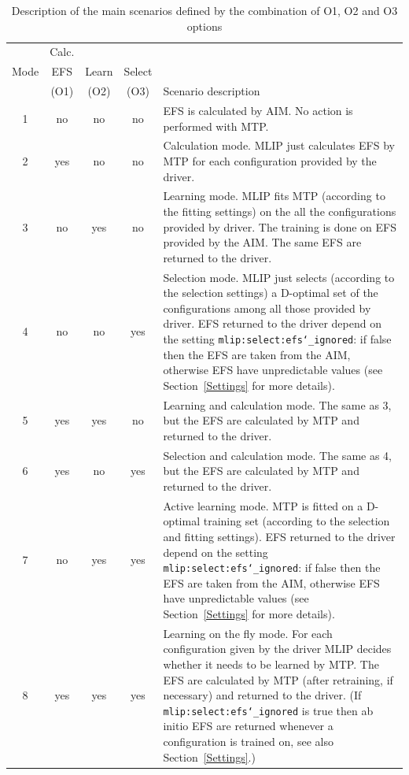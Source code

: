 \documentclass[12pt]{article}
\renewcommand{\_}{\char`_}
\begin{document}
\begin{table}[htbp]	\small
	\centering
	\caption{Description of the main scenarios defined by the combination of O1, O2 and O3 options}
	\medskip
	\label{tab:regimes}
	\begin{tabular}{c|c|c|c|p{}}
		     & Calc. &       &        &  \\
		Mode & EFS   & Learn & Select &  \\
		     & (O1)  & (O2)  & (O3)   & Scenario description\\
		\hline
		1&no&no&no& EFS is calculated by AIM. No action is performed with MTP.\\[.5em]
		
		2&yes&no&no& Calculation mode. MLIP just calculates EFS by MTP for each configuration provided by the driver.\\[.5em]
		
		3&no&yes&no& Learning mode.
		MLIP fits MTP (according to the fitting settings) on the all the configurations provided by driver.
		The training is done on EFS provided by the AIM.
		The same EFS are returned to the driver.
		\\[.5em]
		
		4&no&no&yes& Selection mode.
		MLIP just selects (according to the selection settings) a D-optimal set of the configurations among all those provided by driver.
		EFS returned to the driver depend on the setting \texttt{mlip:select:efs\_ignored}: if false then the EFS are taken from the AIM, otherwise EFS have unpredictable values (see Section~\ref{Settings} for more details).\\[.5em]
		
		5&yes&yes&no& Learning and calculation mode. The same as 3,
		but the EFS are calculated by MTP and returned to the driver.\\[.5em]
		
		6&yes&no&yes& Selection and calculation mode. The same as 4, but the EFS are calculated by MTP and returned to the driver.\\[.5em]
		
		7&no&yes&yes& Active learning mode.
		MTP is fitted on a D-optimal training set (according to the selection and fitting settings).
		EFS returned to the driver depend on the setting \texttt{mlip:select:efs\_ignored}: if false then the EFS are taken from the AIM, otherwise EFS have unpredictable values (see Section~\ref{Settings} for more details).\\[.5em]
		
		8&yes&yes&yes& Learning on the fly mode.
		For each configuration given by the driver MLIP decides whether it needs to be learned by MTP.
		The EFS are calculated by MTP (after retraining, if necessary) and returned to the driver. (If \texttt{mlip:select:efs\_ignored} is true then ab initio EFS are returned whenever a configuration is trained on, see also Section~\ref{Settings}.)\\
	\end{tabular}
\end{table}
\end{document}
